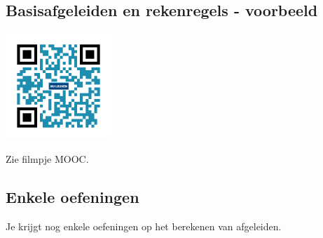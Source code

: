 \subsection{Basisafgeleiden en rekenregels - voorbeeld}
\begin{minipage}{.25\linewidth}
	\raggedright
	\includegraphics[width=4cm]{6_afgeleiden_integralen/inputs/QR_Code_BASISAFG_module6}
\end{minipage}
\begin{minipage}{.7\linewidth}
	Zie filmpje MOOC.
\end{minipage}

\subsection{Enkele oefeningen}
Je krijgt nog enkele oefeningen op het berekenen van afgeleiden.

